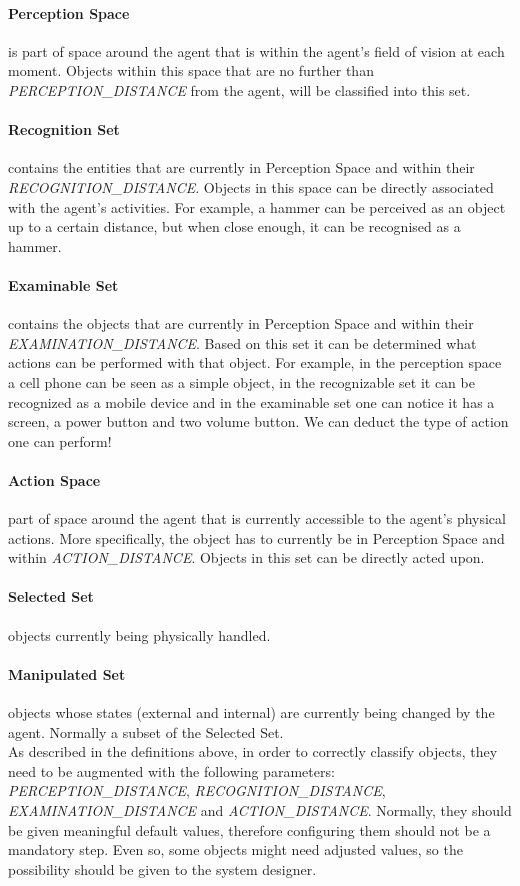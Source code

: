 \paragraph{Perception Space} is part of space around the agent that is within the agent's field of vision at each moment. Objects within this space that are no further than \emph{PERCEPTION\_DISTANCE} from the agent, will be classified into this set.
\paragraph{Recognition Set} contains the entities that are currently in Perception Space and within their \emph{RECOGNITION\_DISTANCE}. Objects in this space can be directly associated with the agent's activities. For example, a hammer can be perceived as an object up to a certain distance, but when close enough, it can be recognised as a hammer.
\paragraph{Examinable Set} contains the objects that are currently in Perception Space and within their \emph{EXAMINATION\_DISTANCE}. Based on this set it can be determined what actions can be performed with that object. For example, in the perception space a cell phone can be seen as a simple object, in the recognizable set it can be recognized as a mobile device and in the examinable set one can notice it has a screen, a power button and two volume button. We can deduct the type of action one can perform!
\paragraph{Action Space} part of space around the agent that is currently accessible to the agent's physical actions. More specifically, the object has to currently be in Perception Space and within \emph{ACTION\_DISTANCE}. Objects in this set can be directly acted upon.
\paragraph{Selected Set} objects currently being physically handled.
\paragraph{Manipulated Set} objects whose states (external and internal) are currently being changed by the agent. Normally a subset of the Selected Set.\\

As described in the definitions above, in order to correctly classify objects, they need to be augmented with the following parameters: \emph{PERCEPTION\_DISTANCE}, \emph{RECOGNITION\_DISTANCE}, \emph{EXAMINATION\_DISTANCE} and \emph{ACTION\_DISTANCE}. Normally, they should be given meaningful default values, therefore configuring them should not be a mandatory step. Even so, some objects might need adjusted values, so the possibility should be given to the system designer.
